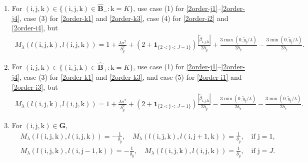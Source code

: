 \documentclass[12pt]{article}
\numberwithin{equation}{section}
\newcommand{\indic}{\mathbf{1}}
\newcommand{\ri}{\mathrm{i}}
\newcommand{\rj}{\mathrm{j}}
\newcommand{\rk}{\mathrm{k}}
\begin{document}
\begin{enumerate}[label = (\arabic*)]
	use case (1) for \eqref{2order-j1}--\eqref{2order-j4}, 
	case (2) for \eqref{2order-k2} and \eqref{2order-k4}, 
	and case (5) for \eqref{2order-i1} and \eqref{2order-i3}, 
	but 
	\begin{align*}
		M_{\lambda}(l(\ri,\rj,\rk), l(\ri,\rj,\rk)) 
		= 1 + \frac{\lambda\sigma^{2}}{\delta_{\tilde{y}}^{2}} 
		+ (2 +\indic_{\{2< \rj < J-1\}})\frac{|\tilde{\beta}_{\ri,\rj,\rk}|}{2\delta_{\tilde{y}}}
		- \frac{3\min(0, \tilde{y}_{\rj}/\lambda)}{2\delta_{\tilde{x}}} 
		+ \frac{3\max(0, \tilde{y}_{\rj}/\lambda)}{2\delta_{\tilde{z}}}.  
	\end{align*}
	\item For $(\ri,\rj,\rk) \in \{(\ri,\rj,\rk)\in \hat{\bm{B}}_{-}: \rk = K\}$, 
	use case (1) for \eqref{2order-j1}--\eqref{2order-j4}, 
	case (3) for \eqref{2order-k1} and \eqref{2order-k3}, 
	case (4) for \eqref{2order-i2} and \eqref{2order-i4}, 
	but 
	\begin{align*}
		M_{\lambda}(l(\ri,\rj,\rk), l(\ri,\rj,\rk)) 
		= 1 + \frac{ \lambda\sigma^{2}}{\delta_{\tilde{y}}^{2}} 
		+ (2 +\indic_{\{2< \rj < J-1\}})\frac{|\tilde{\beta}_{\ri,\rj,\rk}|}{2\delta_{\tilde{y}}}
		+ \frac{3\max(0, \tilde{y}_{\rj}/\lambda)}{2\delta_{\tilde{x}}} 
		- \frac{3\min(0, \tilde{y}_{\rj}/\lambda)}{2\delta_{\tilde{z}}}.  
	\end{align*}
	\item For $(\ri,\rj,\rk) \in \{(\ri,\rj,\rk)\in \hat{\bm{B}}_{+}: \rk = K\}$, 
	use case (1) for \eqref{2order-j1}--\eqref{2order-j4}, 
	case (3) for \eqref{2order-k1} and \eqref{2order-k3}, 
	and case (5) for \eqref{2order-i1} and \eqref{2order-i3},  
	but
	\begin{align*}
		M_{\lambda}(l(\ri,\rj,\rk), l(\ri,\rj,\rk)) 
		= 1 + \frac{ \lambda\sigma^{2}}{\delta_{\tilde{y}}^{2}} 
		+ (2 +\indic_{\{2< \rj < J-1\}})\frac{|\tilde{\beta}_{\ri,\rj,\rk}|}{2\delta_{\tilde{y}}}
		- \frac{3\min(0, \tilde{y}_{\rj}/\lambda)}{2\delta_{\tilde{x}}} 
		- \frac{3\min(0, \tilde{y}_{\rj}/\lambda)}{2\delta_{\tilde{z}}}.  
	\end{align*}
	\item For $(\ri,\rj,\rk) \in \bm{G}$, 
	\begin{align*}
		&M_{\lambda}(l(\ri,\rj,\rk), l(\ri,\rj,\rk)) = -\frac{1}{\delta_{\tilde{y}}}, \quad 
		M_{\lambda}(l(\ri,\rj,\rk), l(\ri,\rj+1,\rk)) = \frac{1}{\delta_{\tilde{y}}}, \quad \text{if~} \rj = 1,\\ 
		&M_{\lambda}(l(\ri,\rj,\rk), l(\ri,\rj-1,\rk)) = -\frac{1}{\delta_{\tilde{y}}}, \quad 
		M_{\lambda}(l(\ri,\rj,\rk), l(\ri,\rj,\rk)) = \frac{1}{\delta_{\tilde{y}}}, \quad \text{if~} \rj = J.
	\end{align*}
\end{enumerate}
\end{document}
